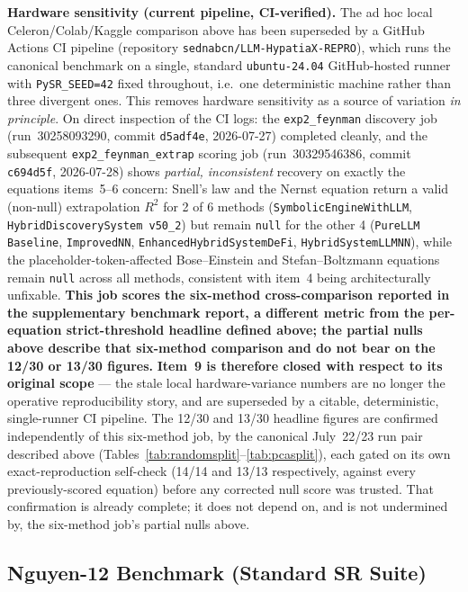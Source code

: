 \documentclass[twoside,11pt]{article}
\newcommand{\Rsq}{R^{2}}
\begin{document}
\textbf{Hardware sensitivity (current pipeline, CI-verified).} The ad hoc
local Celeron/Colab/Kaggle comparison above has been superseded by a
GitHub Actions CI pipeline (repository \texttt{sednabcn/LLM-HypatiaX-REPRO}),
which runs the canonical benchmark on a single, standard
\texttt{ubuntu-24.04} GitHub-hosted runner with \texttt{PySR\_SEED=42} fixed
throughout, i.e.\ one deterministic machine rather than three divergent
ones. This removes hardware sensitivity as a source of variation \emph{in
principle}. On direct inspection of the CI logs: the \texttt{exp2\_feynman}
discovery job (run~30258093290, commit \texttt{d5adf4e}, 2026-07-27)
completed cleanly, and the subsequent \texttt{exp2\_feynman\_extrap} scoring
job (run~30329546386, commit \texttt{c694d5f}, 2026-07-28) shows
\emph{partial, inconsistent} recovery on exactly the equations items~5--6
concern: Snell's law and the Nernst equation return a valid (non-null)
extrapolation $\Rsq$ for 2 of 6 methods (\texttt{SymbolicEngineWithLLM},
\texttt{HybridDiscoverySystem v50\_2}) but remain \texttt{null} for the
other 4 (\texttt{PureLLM Baseline}, \texttt{ImprovedNN},
\texttt{EnhancedHybridSystemDeFi}, \texttt{HybridSystemLLMNN}), while the
placeholder-token-affected Bose--Einstein and Stefan--Boltzmann equations
remain \texttt{null} across all methods, consistent with item~4 being
architecturally unfixable. \textbf{This job scores the six-method
cross-comparison reported in the supplementary benchmark report, a
different metric from the per-equation strict-threshold headline defined
above; the partial nulls above describe that six-method comparison and do
not bear on the 12/30 or 13/30 figures.} \textbf{Item~9 is therefore closed
with respect to its original scope} --- the stale local hardware-variance
numbers are no longer the operative reproducibility story, and are
superseded by a citable, deterministic, single-runner CI pipeline. The
12/30 and 13/30 headline figures are confirmed independently of this
six-method job, by the canonical July~22/23 run pair described above
(Tables~\ref{tab:randomsplit}--\ref{tab:pcasplit}), each gated on its own
exact-reproduction self-check (14/14 and 13/13 respectively, against every
previously-scored equation) before any corrected null score was trusted.
That confirmation is already complete; it does not depend on, and is not
undermined by, the six-method job's partial nulls above.

\subsection{Nguyen-12 Benchmark (Standard SR Suite)}\label{subsec:nguyen12-benchmark-standard-sr-suite}
\label{sec:nguyen12}
\end{document}
